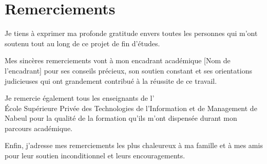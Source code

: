 \documentclass[a4paper, oneside, 12pt, final]{extreport}
\newcommand{\ITBS} {%
\\ École Supérieure Privée des Technologies de l'Information et de Management de Nabeul
}
\begin{document}
\chapter*{Remerciements}

\vspace{1cm}

Je tiens à exprimer ma profonde gratitude envers toutes les personnes qui m'ont soutenu tout au long de ce projet de fin d'études.

Mes sincères remerciements vont à mon encadrant académique [Nom de l'encadrant] pour ses conseils précieux, son soutien constant et ses orientations judicieuses qui ont grandement contribué à la réussite de ce travail.

Je remercie également tous les enseignants de l'\ITBS pour la qualité de la formation qu'ils m'ont dispensée durant mon parcours académique.

Enfin, j'adresse mes remerciements les plus chaleureux à ma famille et à mes amis pour leur soutien inconditionnel et leurs encouragements.

\vspace{2cm}



\tableofcontents
\listoffigures
{}
\listoftables
{}
\listofalgorithms
{}

\clearpage
{}








\end{document}
